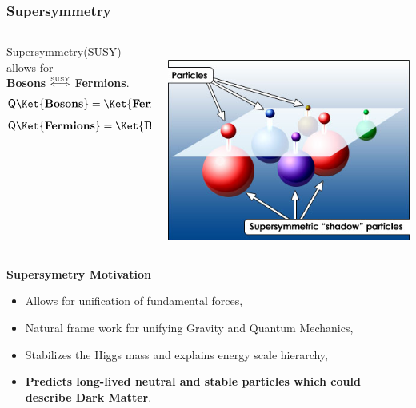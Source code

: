 \documentclass{beamer}
\begin{document}
\begin{frame}
\frametitle{\Huge{Supersymmetry}}
\begin{minipage}[t]{\linewidth}
  \begin{columns}
    \begin{column}{0.6\textwidth}
Supersymmetry(SUSY) allows for \\
 \textbf{Bosons} $ \mathrel{\overset{\makebox[0pt]{\mbox{\normalfont\tiny SUSY}}}{\Longleftrightarrow}} $ \textbf{Fermions}.
\begin{align*}
 \mathsf{Q}\Ket{\mathbf{Bosons}} &= \Ket{\mathbf{Fermions}} 
 \end{align*}
 \begin{align*}
 \mathsf{Q}\Ket{ \mathbf{Fermions}} &= \Ket{\mathbf{Bosons}}
 \end{align*}
 
    \end{column}
    \begin{column}{0.4\textwidth}
     \mbox{
    \includegraphics[height=0.65\textwidth,width=0.30\paperwidth]{THESISPLOTS/New-Physics-PLOTS/sypersymmetry.jpg}}
    \end{column}
 \end{columns}    

\end{minipage}
\begin{minipage}[t]{\linewidth}
  \begin{varblock}[7cm]{\textbf{Supersymetry Motivation}}
  \begin{itemize}
   \item Allows for unification of fundamental forces,
   \item Natural frame work for unifying Gravity and Quantum Mechanics,
   \item Stabilizes the Higgs mass and explains energy scale hierarchy,
   \item \textcolor{UMN@Maroon}{\textbf{Predicts long-lived neutral and stable particles which could describe Dark Matter}}.
  \end{itemize}
  \end{varblock}
\end{minipage}
\end{frame}
\end{document}
